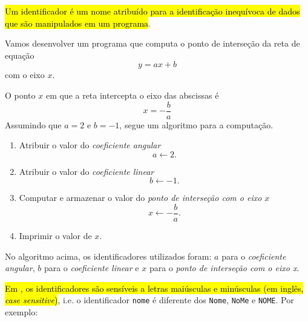 \hl{Um identificador é um nome atribuído para a identificação inequívoca de dados que são manipulados em um programa}.

\begin{ex}\label{cap_lingua_sec_dados:ex:reta}
  Vamos desenvolver um programa que computa o ponto de interseção da reta de equação
  \begin{equation}
    y = ax + b
  \end{equation}
  com o eixo $x$. %


  O ponto $x$ em que a reta intercepta o eixo das abscissas é
  \begin{equation}
    x = -\frac{b}{a}
  \end{equation}
  Assumindo que $a=2$ e $b=-1$, segue um algoritmo para a computação.
  \begin{enumerate}
  \item Atribuir o valor do \emph{coeficiente angular}
    \begin{equation}
      a\leftarrow 2.
    \end{equation}
  \item Atribuir o valor do \emph{coeficiente linear}
    \begin{equation}
      b\leftarrow -1.
    \end{equation}
  \item Computar e armazenar o valor do \emph{ponto de interseção com o eixo $x$}
    \begin{equation}
      x \leftarrow -\frac{b}{a}.
    \end{equation}
  \item Imprimir o valor de $x$.
  \end{enumerate}

  No algoritmo acima, os identificadores utilizados foram: $a$ para o \emph{coeficiente angular}, $b$ para o \emph{coeficiente linear} e $x$ para o \emph{ponto de interseção com o eixo x}.
\end{ex}


\hl{Em {\python}, os identificadores são sensíveis a letras maiúsculas e minúsculas (em inglês, \textit{case sensitive})}, i.e. o identificador \texttt{nome} é diferente dos \texttt{Nome}, \texttt{NoMe} e \texttt{NOME}. Por exemplo:

